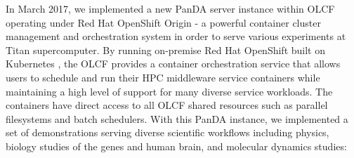 In March 2017, we implemented a new PanDA server instance within OLCF operating
under Red Hat OpenShift Origin \cite{RH_OpenShift} - a powerful container
cluster management and orchestration system in order to serve various
experiments at Titan supercomputer. By running on-premise Red Hat OpenShift
built on Kubernetes \cite{Kubernetes}, the OLCF provides a container
orchestration service that allows users to schedule and run their HPC
middleware service containers while maintaining a high level of support for
many diverse service workloads. The containers have direct access to all OLCF
shared resources such as parallel filesystems and batch schedulers. With this
PanDA instance, we implemented a set of demonstrations serving diverse
scientific workflows including physics, biology studies of the genes and human
brain, and molecular dynamics studies:

